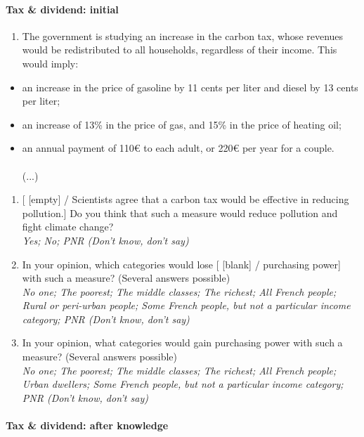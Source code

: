 \documentclass[english,5p,authoryear]{elsarticle}
\begin{document}
\begin{appendices}
\paragraph{Tax \& dividend: initial}
\begin{enumerate}[resume,leftmargin=*]
\item The government is studying an increase in the carbon tax, whose revenues
would be redistributed to all households, regardless of their income.
This would imply: 
\end{enumerate}
\begin{itemize}
\item an increase in the price of gasoline by 11 cents per liter and diesel
by 13 cents per liter; 
\item an increase of 13\% in the price of gas, and 15\% in the price of
heating oil;
\item an annual payment of 110\euro{} to each adult, or 220\euro{} per year for a couple.
\\
\\
(...)
\end{itemize}
\begin{enumerate}[resume,leftmargin=*]
\item {[} {[}empty{]} / Scientists agree that a carbon tax would be effective
in reducing pollution.{]} Do you think that such a measure would reduce
pollution and fight climate change? \emph{}\\
\emph{Yes; No; PNR (Don't know, don't say)}
\item In your opinion, which categories would lose {[} {[}blank{]} / purchasing
power{]} with such a measure? (Several answers possible) \emph{}\\
\emph{No one; The poorest; The middle classes; The richest; All French
people; Rural or peri-urban people; Some French people, but not a
particular income category; PNR (Don't know, don't say)} 
\item In your opinion, what categories would gain purchasing power with
such a measure? (Several answers possible) \emph{}\\
\emph{No one; The poorest; The middle classes; The richest; All French
people; Urban dwellers; Some French people, but not a particular income
category; PNR (Don't know, don't say)} 
\end{enumerate}

\paragraph{Tax \& dividend: after knowledge}


\end{appendices}
\end{document}

